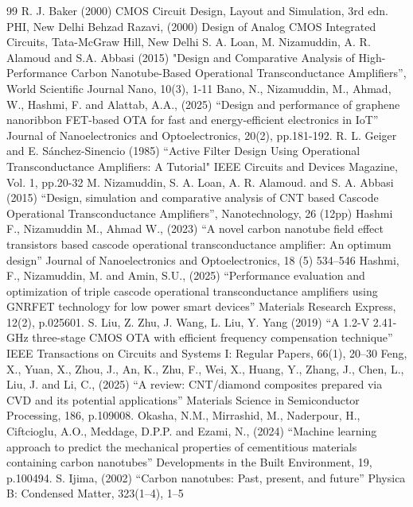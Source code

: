 
\begin{thebibliography}{99}
   R. J. Baker (2000) CMOS Circuit Design, Layout and Simulation, 3rd edn. PHI, New Delhi
   Behzad Razavi, (2000) Design of Analog CMOS Integrated Circuits, Tata-McGraw Hill, New Delhi
   S. A. Loan, M. Nizamuddin, A. R. Alamoud and S.A. Abbasi (2015) "Design and Comparative Analysis of High-Performance Carbon Nanotube-Based Operational Transconductance Amplifiers”, World Scientific Journal Nano, 10(3), 1-11
   Bano, N., Nizamuddin, M., Ahmad, W., Hashmi, F. and Alattab, A.A., (2025) “Design and performance of graphene nanoribbon FET-based OTA for fast and energy-efficient electronics in IoT” Journal of Nanoelectronics and Optoelectronics, 20(2), pp.181-192.
   R. L. Geiger and E. Sánchez-Sinencio (1985) “Active Filter Design Using Operational Transconductance Amplifiers: A Tutorial" IEEE Circuits and Devices Magazine, Vol. 1, pp.20-32
   M. Nizamuddin, S. A. Loan, A. R. Alamoud. and S. A. Abbasi (2015) “Design, simulation and comparative analysis of CNT based Cascode Operational Transconductance Amplifiers”, Nanotechnology, 26 (12pp)
   Hashmi F., Nizamuddin M., Ahmad W., (2023) “A novel carbon nanotube field effect transistors based   cascode operational transconductance amplifier: An optimum design” Journal of Nanoelectronics and Optoelectronics, 18 (5) 534–546
   Hashmi, F., Nizamuddin, M. and Amin, S.U., (2025) “Performance evaluation and optimization of triple cascode operational transconductance amplifiers using GNRFET technology for low power smart devices” Materials Research Express, 12(2), p.025601.
   S. Liu, Z. Zhu, J. Wang, L. Liu, Y. Yang (2019) “A 1.2-V 2.41-GHz three-stage CMOS OTA with efficient frequency compensation technique”  IEEE Transactions on Circuits and Systems I: Regular Papers, 66(1), 20–30
   Feng, X., Yuan, X., Zhou, J., An, K., Zhu, F., Wei, X., Huang, Y., Zhang, J., Chen, L., Liu, J. and Li, C., (2025) “A review: CNT/diamond composites prepared via CVD and its potential applications” Materials Science in Semiconductor Processing, 186, p.109008.
   Okasha, N.M., Mirrashid, M., Naderpour, H., Ciftcioglu, A.O., Meddage, D.P.P. and Ezami, N., (2024) “Machine learning approach to predict the mechanical properties of cementitious materials containing carbon nanotubes” Developments in the Built Environment, 19, p.100494.
   S. Ijima, (2002) “Carbon nanotubes: Past, present, and future” Physica B: Condensed Matter, 323(1–4), 1–5

\end{thebibliography}
